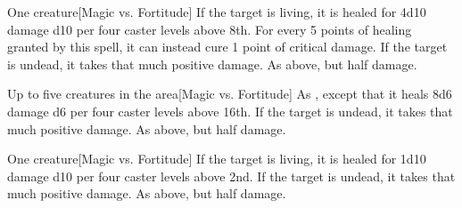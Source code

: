 \begin{spellheader}
    \spellrng{\rngclose}
\end{spellheader}
\begin{spelleffects}
    \begin{spelltarget}{One creature}[Magic vs. Fortitude]
        \spelleffect If the target is living, it is healed for 4d10 damage \add d10 per four caster levels above 8th. For every 5 points of healing granted by this spell, it can instead cure 1 point of critical damage.
        \spellsuccess If the target is undead, it takes that much positive damage.
        \spellfailure As above, but half damage.
    \end{spelltarget}
\end{spelleffects}

\begin{spellheader}
    \spellrng{\rngclose}
\end{spellheader}
\begin{spelleffects}
    \begin{spelltargets}{Up to five creatures in the area}[Magic vs. Fortitude]
        \spelleffect As , except that it heals 8d6 damage \add d6 per four caster levels above 16th.
        \spellsuccess If the target is undead, it takes that much positive damage.
        \spellfailure As above, but half damage.
    \end{spelltargets}
\end{spelleffects}

\begin{spellheader}
    \spellrng{\rngclose}
\end{spellheader}
\begin{spelleffects}
    \begin{spelltarget}{One creature}[Magic vs. Fortitude]
        \spelleffect If the target is living, it is healed for 1d10 damage \add d10 per four caster levels above 2nd.
        \spellsuccess If the target is undead, it takes that much positive damage.
        \spellfailure As above, but half damage.
    \end{spelltarget}
\end{spelleffects}

